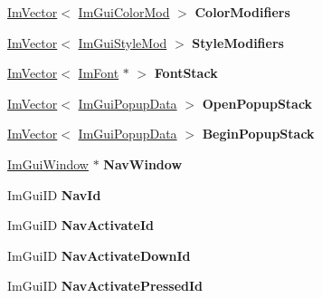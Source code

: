 \begin{DoxyCompactItemize}
\hyperlink{structImVector}{Im\+Vector}$<$ \hyperlink{structImGuiColorMod}{Im\+Gui\+Color\+Mod} $>$ {\bfseries Color\+Modifiers}
\item 
\mbox{\label{structImGuiContext_ac0feba14c36c7dff87211c3650815be7}} 
\hyperlink{structImVector}{Im\+Vector}$<$ \hyperlink{structImGuiStyleMod}{Im\+Gui\+Style\+Mod} $>$ {\bfseries Style\+Modifiers}
\item 
\mbox{\label{structImGuiContext_a8a6a9f23604fe0d0b51c78e45e4432b0}} 
\hyperlink{structImVector}{Im\+Vector}$<$ \hyperlink{structImFont}{Im\+Font} $\ast$ $>$ {\bfseries Font\+Stack}
\item 
\mbox{\label{structImGuiContext_a0f175fa6d802c77e1c3bda0555bffaef}} 
\hyperlink{structImVector}{Im\+Vector}$<$ \hyperlink{structImGuiPopupData}{Im\+Gui\+Popup\+Data} $>$ {\bfseries Open\+Popup\+Stack}
\item 
\mbox{\label{structImGuiContext_a4f9f576391ae6d84f32ad57ff9ba43ed}} 
\hyperlink{structImVector}{Im\+Vector}$<$ \hyperlink{structImGuiPopupData}{Im\+Gui\+Popup\+Data} $>$ {\bfseries Begin\+Popup\+Stack}
\item 
\mbox{\label{structImGuiContext_ae06077e45c894488b28baaf2d7ff8e41}} 
\hyperlink{structImGuiWindow}{Im\+Gui\+Window} $\ast$ {\bfseries Nav\+Window}
\item 
\mbox{\label{structImGuiContext_a0416d655ac426f9923dab220d95a4b6b}} 
Im\+Gui\+ID {\bfseries Nav\+Id}
\item 
\mbox{\label{structImGuiContext_a809b5fc440a6198e4266b36150dc3396}} 
Im\+Gui\+ID {\bfseries Nav\+Activate\+Id}
\item 
\mbox{\label{structImGuiContext_a07e49e172b0aad8b1ff2ac3df71b788b}} 
Im\+Gui\+ID {\bfseries Nav\+Activate\+Down\+Id}
\item 
\mbox{\label{structImGuiContext_a24929a88fa69cfb49cfd41c8cb4225d0}} 
Im\+Gui\+ID {\bfseries Nav\+Activate\+Pressed\+Id}
\item 
\mbox{\label{structImGuiContext_a61db117ce7f7128f90be0ea560c004b2}} 

\end{DoxyCompactItemize}

